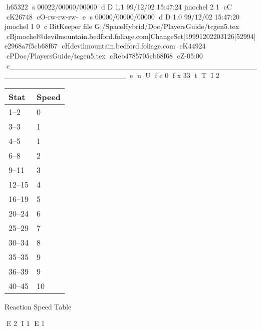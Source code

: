 h65322
s 00022/00000/00000
d D 1.1 99/12/02 15:47:24 jmochel 2 1
cC
cK26748
cO-rw-rw-rw-
e
s 00000/00000/00000
d D 1.0 99/12/02 15:47:20 jmochel 1 0
c BitKeeper file G:/SpaceHybrid/Doc/PlayersGuide/tcgen5.tex
cBjmochel@devilmountain.bedford.foliage.com|ChangeSet|19991202203126|52994|e2968a7f5cb68f67
cHdevilmountain.bedford.foliage.com
cK44924
cPDoc/PlayersGuide/tcgen5.tex
cReb4785705cb68f68
cZ-05:00
c______________________________________________________________________
e
u
U
f e 0
f x 33
t
T
I 2
\begin{SHTable}[h]
	\begin{tabular}{ll}
	Stat    & Speed \\
	\hline
	1--2	& 0		   \\
	3--3	& 1		   \\
	4--5	& 1		   \\
	6--8	& 2		   \\
	9--11	& 3		   \\
	12--15  & 4		   \\
	16--19  & 5		   \\
	20--24  & 6		   \\
	25--29  & 7		   \\
	30--34  & 8		   \\
	35--35  & 9		   \\
	36--39  & 9		   \\ 
	40--45  & 10	   \\ 
    \end{tabular}
    \caption{Reaction Speed Table} \label{Table:Speed}
\end{SHTable}
E 2
I 1
E 1
